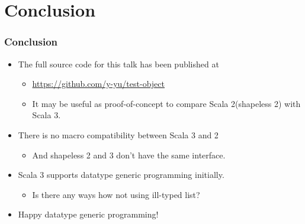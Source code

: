 \section{Conclusion}

\begin{frame}
  \frametitle{Conclusion}

  \pause
  \begin{itemize}
    \item<+-> The full source code for this talk has been published at 
    \begin{itemize}
      \item \url{https://github.com/y-yu/test-object}
      \item It may be useful as proof-of-concept to compare Scala 2(shapeless 2) with Scala 3.
    \end{itemize}

    \item<+-> There is no macro compatibility between Scala 3 and 2
    \begin{itemize}
      \item And shapeless 2 and 3 don't have the same interface.
    \end{itemize}

    \item<+-> Scala 3 supports datatype generic programming initially.
    \begin{itemize}
      \item Is there any ways how not using ill-typed list?
    \end{itemize}

    \item<+-> Happy datatype generic programming!
  \end{itemize}

\end{frame}

